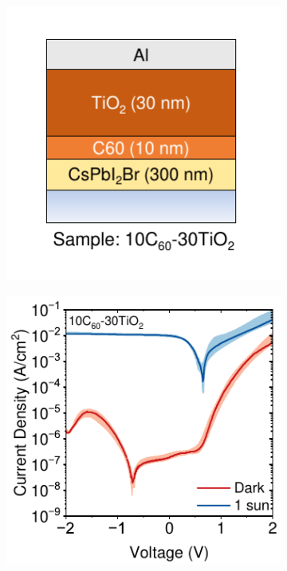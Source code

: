 \begin{figure}[t]
    \centering
    \begin{subfigure}[t]{0.4\textwidth}
        \centering
        \includegraphics[width=\textwidth]{chapters/transport_layers/images/Sample_10_30_icon.pdf} %
        \caption{}
        \label{}
    \end{subfigure}
    \hspace{0.5cm}
    \begin{subfigure}[t]{0.4\textwidth}
        \centering
        \includegraphics[width=\textwidth]{chapters/transport_layers/images/JV_Median_10_30.pdf} 

\end{subfigure}
\end{figure}
